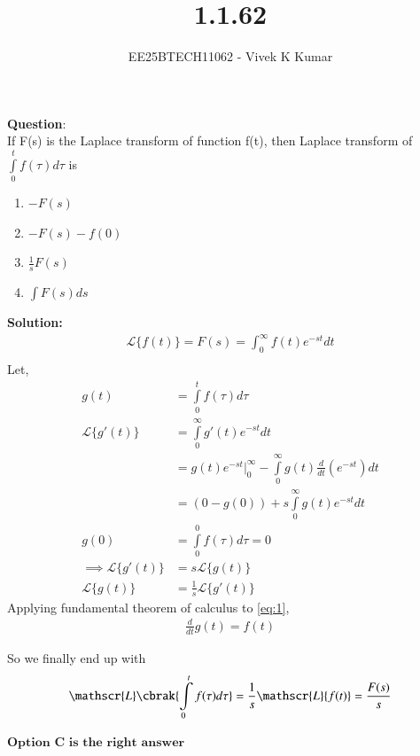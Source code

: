 \documentclass[journal]{IEEEtran}
\title{1.1.62}
\author{EE25BTECH11062 - Vivek K Kumar}
\begin{document}
\maketitle

\renewcommand{\thefigure}{\theenumi}
\renewcommand{\thetable}{\theenumi}


\textbf{Question}:\\
If F(s) is the Laplace transform of function f(t), then Laplace transform of $\int\limits_0^t f(\tau) d\tau$ is
\begin{enumerate}
    \item $-F(s)$
    \item $-F(s) - f(0)$
    \item $\frac{1}{s}F(s)$
    \item $\int F(s)ds$
\end{enumerate}
\textbf{Solution: }
\begin{align}
\mathscr{L}\{f(t)\} = F(s) = \int_0^{\infty}f(t)e^{-st}dt \\
\end{align}
Let, 
\begin{align}
    g(t) &= \int\limits_0^tf(\tau)d\tau \label{eq:1} \\
    \mathscr{L}\{g'(t)\} &= \int\limits_0^\infty g'(t)e^{-st}dt \\
    &= g(t)e^{-st} \bigg|_{0}^{\infty} - \int\limits_0^\infty g(t)\frac{d}{dt}(e^{-st})dt \\
    &= (0 - g(0)) + s\int\limits_0^\infty g(t)e^{-st}dt \\
    g(0) &= \int\limits_0^0f(\tau)d\tau
         = 0\\
    \implies \mathscr{L}\{g'(t)\} &= s \mathscr{L}\{g(t)\} \\
    \mathscr{L}\{g(t)\} &= \frac{1}{s}\mathscr{L}\{g'(t)\}
\end{align}
Applying fundamental theorem of calculus to \eqref{eq:1},
\begin{align}
    \frac{d}{dt}g(t) = f(t)
\end{align}

So we finally end up with
\begin{align}
    \mathscr{L}\cbrak{\int\limits_0^tf(\tau)d\tau} = \frac{1}{s}\mathscr{L}\{f(t)\} = \frac{F(s)}{s}
\end{align}
\begin{center}
$\boxed{\textbf{Option C is the right answer}}$
\end{center}
\end{document}
